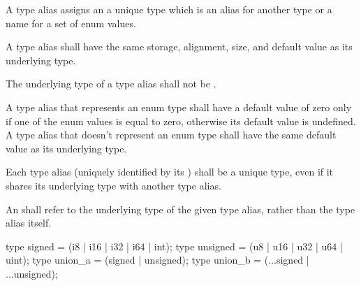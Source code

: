 \specsubsubitem
A type alias assigns an  a unique type which is an
alias for another type or a name for a set of enum values.


\specsubsubitem
A type alias shall have the same storage, alignment, size, and default value as
its underlying type.

\specsubsubitem
The underlying type of a type alias shall not be .

\specsubsubitem
A type alias that represents an enum type shall have a default value of zero
only if one of the enum values is equal to zero, otherwise its default value is
undefined. A type alias that doesn't represent an enum type shall have the same
default value as its underlying type.

\specsubsubitem
Each type alias (uniquely identified by its ) shall be
a unique type, even if it shares its underlying type with another type alias.

\specsubsubitem
An  shall refer to the underlying type of the given
type alias, rather than the type alias itself.


\begin{codesample}
type signed = (i8 | i16 | i32 | i64 | int);
type unsigned = (u8 | u16 | u32 | u64 | uint);
type union_a = (signed | unsigned);
type union_b = (...signed | ...unsigned);
\end{codesample}

